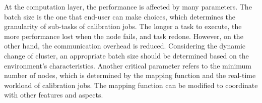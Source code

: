 At the computation layer, the performance is affected by many parameters. 
The batch size is the one that end-user can make choices, which determines the granularity of sub-tasks of calibration jobs. 
The longer a task to execute, the more performance lost when the node fails, and task redone. 
However, on the other hand, the communication overhead is reduced. 
Considering the dynamic change of cluster, an appropriate batch size should be determined based on the environment’s characteristics.
Another critical parameter refers to the minimum number of nodes, which is determined by the mapping function and the real-time workload of calibration jobs. 
The mapping function can be modified to coordinate with other features and aspects.
 



